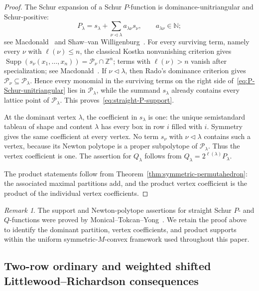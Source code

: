 \documentclass[11pt,a4paper,oneside]{amsart}
\numberwithin{equation}{section}
\theoremstyle{definition}
\theoremstyle{remark}
\newtheorem{remark}[theorem]{Remark}
\DeclareMathOperator{\Supp}{Supp}
\newcommand{\N}{\mathbb N}
\newcommand{\Z}{\mathbb Z}
\begin{document}
\begin{proof}
The Schur expansion of a Schur $P$-function is dominance-unitriangular and Schur-positive:
\begin{equation}\label{eq:P-Schur-unitriangular}
 P_\lambda=s_\lambda+
 \sum_{\nu\lhd\lambda}a_{\lambda\nu}s_\nu,
 \qquad a_{\lambda\nu}\in\N;
\end{equation}
see Macdonald~\cite[Chapter~III, equation~(8.17)(ii)]{Macdonald} and Shaw--van Willigenburg~\cite[Section~1]{ShawVW07}.  For every surviving term, namely every $\nu$ with $\ell(\nu)\leq n$, the classical Kostka nonvanishing criterion gives
$\Supp(s_\nu(x_1,\ldots,x_n))=\mathcal P_\nu\cap\Z^n$; terms with
$\ell(\nu)>n$ vanish after specialization; see
Macdonald~\cite[Chapter~I, Section~6]{Macdonald}.  If $\nu\lhd\lambda$, then Rado's dominance criterion gives
$\mathcal P_\nu\subseteq\mathcal P_\lambda$.  Hence every monomial in the surviving terms on the right side of~\eqref{eq:P-Schur-unitriangular} lies in
$\mathcal P_\lambda$, while the summand $s_\lambda$ already contains every lattice point of $\mathcal P_\lambda$.  This proves~\eqref{eq:straight-P-support}.

At the dominant vertex $\lambda$, the coefficient in $s_\lambda$ is one: the unique semistandard tableau of shape and content $\lambda$ has every box in row $i$ filled with $i$.  Symmetry gives the same coefficient at every vertex.  No term $s_\nu$ with $\nu\lhd\lambda$ contains such a vertex, because its Newton polytope is a proper subpolytope of $\mathcal P_\lambda$.  Thus the vertex coefficient is one.  The assertion for $Q_\lambda$ follows from $Q_\lambda=2^{\ell(\lambda)}P_\lambda$.

The product statements follow from Theorem~\ref{thm:symmetric-permutahedron}: the associated maximal partitions add, and the product vertex coefficient is the product of the individual vertex coefficients.
\end{proof}

\begin{remark}
The support and Newton-polytope assertions for straight Schur $P$- and $Q$-functions were proved by Monical--Tokcan--Yong~\cite[Proposition~3.5]{MTY19}.  We retain the proof above to identify the dominant partition, vertex coefficients, and product supports within the uniform symmetric-$M$-convex framework used throughout this paper.
\end{remark}

\subsection{Two-row ordinary and weighted shifted Littlewood--Richardson consequences}
\end{document}
